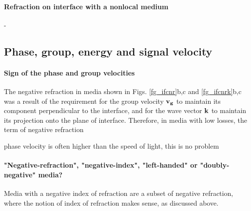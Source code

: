 \paragraph{Refraction on interface with a nonlocal medium}   %
-





\subsection{Phase, group, energy and signal velocity}
\paragraph{Sign of the phase and group velocities}%
The negative refraction in media shown in Figs. \ref{fg_ifcnr}b,c and \ref{fg_ifcnrk}b,c was a result of the requirement for the group velocity ${\mathbf{v_g}}$ to maintain its component perpendicular to the interface, and for the wave vector ${\mathbf{k}}$ to maintain its projection onto the plane of interface. Therefore, in media with low losses, the term of negative refraction 


phase velocity is often higher than the speed of light, this is no problem\\

\paragraph{"Negative-refraction", "negative-index", "left-handed" or "doubly-negative" media?}  %
Media with a negative index of refraction are a subset of negative refraction, where the notion of index of refraction makes sense, as discussed above.

